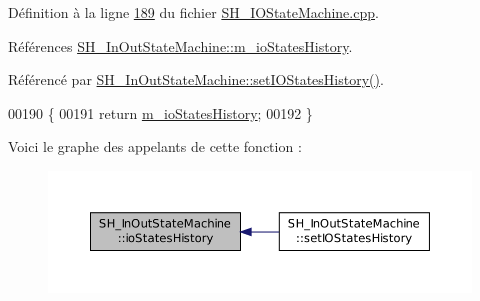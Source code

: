 Définition à la ligne \hyperlink{SH__IOStateMachine_8cpp_source_l00189}{189} du fichier \hyperlink{SH__IOStateMachine_8cpp_source}{S\-H\-\_\-\-I\-O\-State\-Machine.\-cpp}.



Références \hyperlink{classSH__InOutStateMachine_ac46ad1af230e1b2156d805275690dec3}{S\-H\-\_\-\-In\-Out\-State\-Machine\-::m\-\_\-io\-States\-History}.



Référencé par \hyperlink{classSH__InOutStateMachine_af51f92c37d00a4eec4da42113cfd7d73}{S\-H\-\_\-\-In\-Out\-State\-Machine\-::set\-I\-O\-States\-History()}.


\begin{DoxyCode}
00190 \{
00191     \textcolor{keywordflow}{return} \hyperlink{classSH__InOutStateMachine_ac46ad1af230e1b2156d805275690dec3}{m\_ioStatesHistory};
00192 \}
\end{DoxyCode}


Voici le graphe des appelants de cette fonction \-:\nopagebreak
\begin{figure}[H]
\begin{center}
\leavevmode
\includegraphics[width=350pt]{classSH__InOutStateMachine_a13889998c6dcd17db984dd6ed1454e80_icgraph}
\end{center}
\end{figure}



